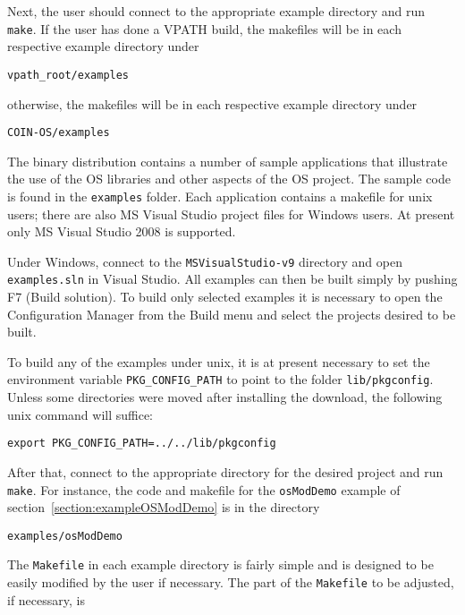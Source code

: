 Next, the user should connect to the appropriate example directory and run {\tt make}.
If the user has done a VPATH build, the makefiles will be in each respective example directory under
\begin{verbatim}
vpath_root/examples
\end{verbatim}
otherwise, the makefiles will be in each respective example directory under
\begin{verbatim}
COIN-OS/examples
\end{verbatim}
\else
The binary distribution contains a number of sample applications that illustrate the use of the
OS libraries and other aspects of the OS project. The sample code is found in the {\tt examples}
folder. Each application contains a makefile for unix users; there are also MS Visual Studio project files 
for Windows users. At present only MS Visual Studio 2008 is supported.

Under Windows, connect to the {\tt MSVisualStudio-v9} directory and open {\tt examples.sln} in Visual Studio. All examples can then be built simply by pushing F7 (Build solution). To build only selected examples it is necessary to open the Configuration Manager from the Build menu and select the projects desired to be built.

To build any of the examples under unix, it is at present necessary to set the environment variable
{\tt PKG\_CONFIG\_PATH} to point to the folder {\tt lib/pkgconfig}. Unless some directories were
moved after installing the download, the following unix command will suffice:

\begin{verbatim}
export PKG_CONFIG_PATH=../../lib/pkgconfig
\end{verbatim}

After that, connect to the appropriate directory for the desired project and run {\tt make}. 
For instance, the code and makefile for the {\tt osModDemo}
example of section~\ref{section:exampleOSModDemo} is in the directory
\begin{verbatim}
examples/osModDemo
\end{verbatim}

 
\fi

The {\tt Makefile} in each example directory is fairly simple and is designed to be easily modified 
by the user if necessary.  The part of the {\tt Makefile} to be adjusted, if necessary, is

